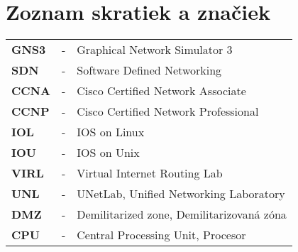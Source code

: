 \chapter*{Zoznam skratiek a značiek}

\begin{longtabu} to \textwidth {X[0.5,l] X[0.2,c] X[5,l]}
    \textbf{GNS3} & - & Graphical Network Simulator 3 \\
    \textbf{SDN} & - & Software Defined Networking \\
    \textbf{CCNA} & - & Cisco Certified Network Associate \\
    \textbf{CCNP} & - & Cisco Certified Network Professional \\
    \textbf{IOL} & - & IOS on Linux \\
    \textbf{IOU} & - & IOS on Unix \\
    \textbf{VIRL} & - & Virtual Internet Routing Lab \\
    \textbf{UNL} & - & UNetLab, Unified Networking Laboratory \\
    \textbf{DMZ} & - & Demilitarized zone, Demilitarizovaná zóna \\
    \textbf{CPU} & - & Central Processing Unit, Procesor \\
\end{longtabu}

\setcounter{table}{0}